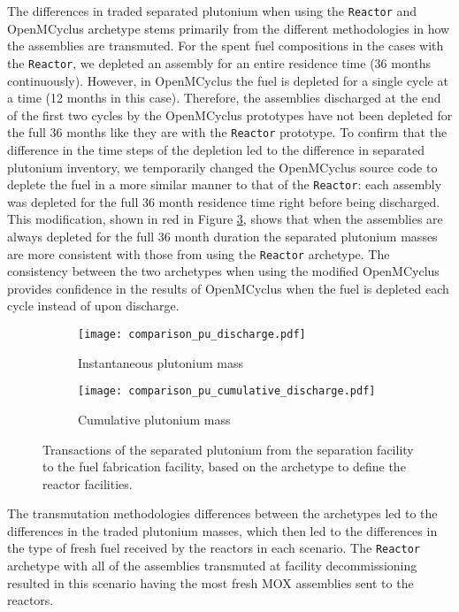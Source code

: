 The differences in traded separated plutonium when using the \Cycamore 
\texttt{Reactor} and OpenMCyclus archetype stems 
primarily from the different methodologies in how the assemblies 
are transmuted. For the spent fuel compositions in the cases with the \Cycamore 
\texttt{Reactor}, we depleted an assembly for an entire residence time 
(36 months continuously). However, in OpenMCyclus the fuel is depleted for 
a single cycle at a time (12 months in this case). Therefore, the 
assemblies discharged at the end of the first two cycles by the 
OpenMCyclus prototypes have not been depleted for the full 36 months 
like they are with the \Cycamore \texttt{Reactor} prototype. To confirm  
that the difference in the time steps of the depletion led to the 
difference in separated plutonium inventory, we temporarily changed
the OpenMCyclus source code to deplete the fuel in a more similar 
manner to that of the \Cycamore \texttt{Reactor}: each assembly was 
depleted for the full 36 month residence time right before being 
discharged. This modification, shown in red in Figure 
\ref{fig:comparison_pu_discharge}, shows that when the assemblies 
are always depleted for the full 36 month duration the 
separated plutonium masses are more consistent with those from 
using the \Cycamore \texttt{Reactor} archetype. The consistency 
between the two archetypes when using the modified OpenMCyclus 
provides confidence in the results of OpenMCyclus when the fuel 
is depleted each cycle instead of upon discharge. 
\Cycamore

\begin{figure}[ht!]
    \centering
    \begin{subfigure}[b]{0.48\textwidth}
        \centering
        \texttt{[image: comparison\_pu\_discharge.pdf]}
        \caption{Instantaneous plutonium mass}
        \label{fig:comparison_pu_inst_discharge}
    \end{subfigure}
    \hfill
    \begin{subfigure}[b]{0.48\textwidth}
        \centering
        \texttt{[image: comparison\_pu\_cumulative\_discharge.pdf]}
        \caption{Cumulative plutonium mass}
        \label{fig:comparison_pu_cumulative_discharge}
    \end{subfigure}
       \caption{Transactions of the separated plutonium from the
       separation facility to the fuel fabrication facility, based 
       on the archetype to define the reactor facilities.}
       \label{fig:comparison_pu_discharge}
\end{figure}

The transmutation methodologies differences between the archetypes 
led to the differences in the traded plutonium masses, which then 
led to the differences in the type of fresh fuel received by 
the reactors in each scenario. The \Cycamore \texttt{Reactor}
archetype with all of the assemblies transmuted at facility 
decommissioning resulted in this scenario having the most 
fresh \gls{MOX} assemblies sent to the reactors.
